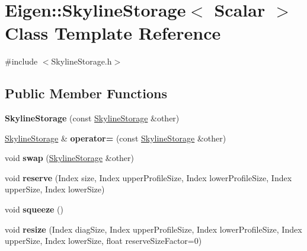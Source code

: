 \hypertarget{class_eigen_1_1_skyline_storage}{}\section{Eigen\+:\+:Skyline\+Storage$<$ Scalar $>$ Class Template Reference}
\label{class_eigen_1_1_skyline_storage}


{\ttfamily \#include $<$Skyline\+Storage.\+h$>$}

\subsection*{Public Member Functions}
\begin{DoxyCompactItemize}
\item 
\mbox{\label{class_eigen_1_1_skyline_storage_a3c14a6c60c59bce3651ab41049bb4c4f}} 
{\bfseries Skyline\+Storage} (const \hyperlink{class_eigen_1_1_skyline_storage}{Skyline\+Storage} \&other)
\item 
\mbox{\label{class_eigen_1_1_skyline_storage_a7738010c4f6de76370ec7796ed06c7d1}} 
\hyperlink{class_eigen_1_1_skyline_storage}{Skyline\+Storage} \& {\bfseries operator=} (const \hyperlink{class_eigen_1_1_skyline_storage}{Skyline\+Storage} \&other)
\item 
\mbox{\label{class_eigen_1_1_skyline_storage_a36cb5d6dee2f6e9ee3929799840be1c5}} 
void {\bfseries swap} (\hyperlink{class_eigen_1_1_skyline_storage}{Skyline\+Storage} \&other)
\item 
\mbox{\label{class_eigen_1_1_skyline_storage_a4b124e460d00bb59e892bf14f2b466a6}} 
void {\bfseries reserve} (Index size, Index upper\+Profile\+Size, Index lower\+Profile\+Size, Index upper\+Size, Index lower\+Size)
\item 
\mbox{\label{class_eigen_1_1_skyline_storage_a6be0d1708b4048b5bfef64c296b12f59}} 
void {\bfseries squeeze} ()
\item 
\mbox{\label{class_eigen_1_1_skyline_storage_a4735650ecee3ca2348d4225315260576}} 
void {\bfseries resize} (Index diag\+Size, Index upper\+Profile\+Size, Index lower\+Profile\+Size, Index upper\+Size, Index lower\+Size, float reserve\+Size\+Factor=0)

\end{DoxyCompactItemize}
